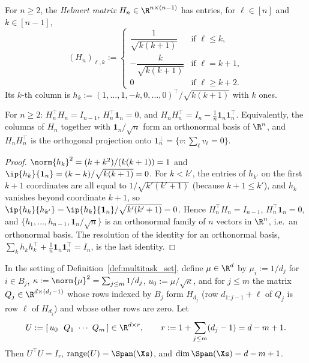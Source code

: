 \begin{definition}\label{def:helmert}
For $n \ge 2$, the \emph{Helmert matrix} $H_n \in \R^{n\times(n-1)}$ has entries, for
$\ell \in [n]$ and $k \in [n-1]$,
\[
  (H_n)_{\ell,k} :=
  \begin{cases}
    \dfrac{1}{\sqrt{k(k+1)}} & \text{if } \ell \le k,\\[8pt]
    -\dfrac{k}{\sqrt{k(k+1)}} & \text{if } \ell = k+1,\\[8pt]
    0 & \text{if } \ell \ge k+2 .
  \end{cases}
\]
Its $k$-th column is $h_k := (1,\dots,1,-k,0,\dots,0)^\top/\sqrt{k(k+1)}$ with $k$ ones.
\end{definition}

\begin{lemma}\label{lem:helmert_props}
For $n\ge 2$: $H_n^\top H_n = I_{n-1}$, $H_n^\top\mathbf 1_n = 0$, and
$H_nH_n^\top = I_n - \frac1n\mathbf 1_n\mathbf 1_n^\top$. Equivalently, the columns of $H_n$
together with $\mathbf 1_n/\sqrt n$ form an orthonormal basis of $\R^n$, and $H_nH_n^\top$ is
the orthogonal projection onto $\mathbf 1_n^\perp = \{v : \sum_\ell v_\ell = 0\}$.
\end{lemma}

\begin{proof}
$\norm{h_k}^2 = (k + k^2)/(k(k+1)) = 1$ and $\ip{h_k}{\mathbf 1_n} = (k - k)/\sqrt{k(k+1)} = 0$.
For $k < k'$, the entries of $h_{k'}$ on the first $k+1$ coordinates are all equal to
$1/\sqrt{k'(k'+1)}$ (because $k+1 \le k'$), and $h_k$ vanishes beyond coordinate $k+1$, so
$\ip{h_k}{h_{k'}} = \ip{h_k}{\mathbf 1_n}/\sqrt{k'(k'+1)} = 0$. Hence $H_n^\top H_n = I_{n-1}$,
$H_n^\top\mathbf 1_n = 0$, and $\{h_1,\dots,h_{n-1},\mathbf 1_n/\sqrt n\}$ is an orthonormal
family of $n$ vectors in $\R^n$, i.e.\ an orthonormal basis. The resolution of the identity
for an orthonormal basis, $\sum_k h_kh_k^\top + \frac1n\mathbf 1_n\mathbf 1_n^\top = I_n$,
is the last identity.
\end{proof}

\begin{lemma}\label{lem:multitask_basis}
\leanok
{}
In the setting of Definition~\ref{def:multitask_set}, define $\mu \in \R^d$ by
$\mu_i := 1/d_j$ for $i \in B_j$, $\kappa := \norm{\mu}^2 = \sum_{j\le m}1/d_j$,
$u_0 := \mu/\sqrt\kappa$, and for $j \le m$ the matrix $Q_j \in \R^{d\times(d_j-1)}$ whose
rows indexed by $B_j$ form $H_{d_j}$ (row $d_{1:j-1}+\ell$ of $Q_j$ is row $\ell$ of
$H_{d_j}$) and whose other rows are zero. Let
\[
  U := [\,u_0\ \ Q_1\ \cdots\ Q_m\,] \in \R^{d\times r}, \qquad r := 1 + \sum_{j\le m}(d_j - 1) = d - m + 1 .
\]
Then $U^\top U = I_r$, $\mathrm{range}(U) = \Span(\Xs)$, and $\dim\Span(\Xs) = d - m + 1$.
\end{lemma}

